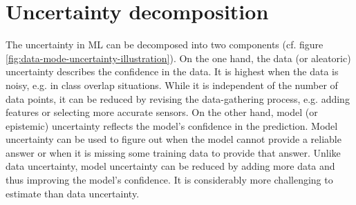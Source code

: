 


\section{Uncertainty decomposition}

The uncertainty in ML can be decomposed into two components\cite{surveyUQinDL} (cf. figure \ref{fig:data-mode-uncertainty-illustration}). 
On the one hand, the data (or aleatoric) uncertainty describes the confidence in the data. It is highest when the data is noisy, e.g. in class overlap situations. While it is independent of the number of data points, it can be reduced by revising the data-gathering process, e.g. adding features or selecting more accurate sensors.
On the other hand,  model (or epistemic) uncertainty reflects the model's confidence in the prediction. Model uncertainty can be used to figure out when the model cannot provide a reliable answer or when it is missing some training data to provide that answer. Unlike data uncertainty, model uncertainty can be reduced by adding more data and thus improving the model's confidence. It is considerably more challenging to estimate than data uncertainty.




